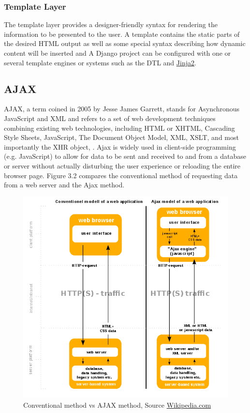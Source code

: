 \subsubsection{Template Layer}
The template layer provides a designer-friendly syntax for rendering the information to be presented to the user. A template contains the static parts of the desired \ac{HTML} output as well as some special syntax
describing how dynamic content will be inserted and A Django project can be configured with one or several template engines or systems such as the \ac{DTL} and \href{http://jinja.pocoo.org/}{Jinja2}.
\subsection{\ac{AJAX}}
\ac{AJAX}, a term coined in 2005 by Jesse James Garrett, stands for Asynchronous JavaScript and \ac{XML} and refers to a set of web development techniques combining existing web technologies, including \ac{HTML} or \ac{XHTML}, Cascading Style Sheets, JavaScript, The Document Object Model, \ac{XML}, \ac{XSLT}, and most importantly the \ac{XHR} object, \citet{Yang:2020}. Ajax is widely used in client-side programming (e.g. JavaScript) to allow for data to be sent and received to and from a database or server without actually disturbing the user experience or reloading the entire browser page. Figure 3.2 compares the conventional method of requesting data from a web server and the Ajax method.
\begin{figure}[!htbp]
	\centering
	\includegraphics[width=1\textwidth]{./Ajax.png}
	\caption{Conventional method vs \ac{AJAX} method, Source \href{https://en.wikipedia.org/wiki/File:Ajax-vergleich-en.svg}{Wikipedia.com}}
\end{figure}

